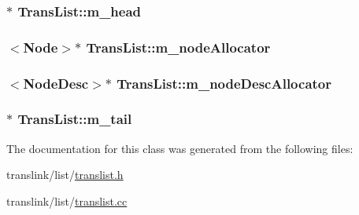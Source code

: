 \hypertarget{classTransList_ab8ac04fb16a967124ea772639fa0beb4}{
\subsubsection[{m\-\_\-head}]{$\ast$ Trans\-List\-::m\-\_\-head\hspace{0.3cm}{\ttfamily [private]}}}\label{classTransList_ab8ac04fb16a967124ea772639fa0beb4}
\hypertarget{classTransList_acab6fed9ee1f8d04411a384854cc9429}{
\subsubsection[{m\-\_\-node\-Allocator}]{$<${\bf Node}$>$$\ast$ Trans\-List\-::m\-\_\-node\-Allocator\hspace{0.3cm}{\ttfamily [private]}}}\label{classTransList_acab6fed9ee1f8d04411a384854cc9429}
\hypertarget{classTransList_ad8a7d0a3827838d2bc7c334502e00b1b}{
\subsubsection[{m\-\_\-node\-Desc\-Allocator}]{$<${\bf Node\-Desc}$>$$\ast$ Trans\-List\-::m\-\_\-node\-Desc\-Allocator\hspace{0.3cm}{\ttfamily [private]}}}\label{classTransList_ad8a7d0a3827838d2bc7c334502e00b1b}
\hypertarget{classTransList_a68984196e5b9927e15999d83dd74c8d7}{
\subsubsection[{m\-\_\-tail}]{$\ast$ Trans\-List\-::m\-\_\-tail\hspace{0.3cm}{\ttfamily [private]}}}\label{classTransList_a68984196e5b9927e15999d83dd74c8d7}


The documentation for this class was generated from the following files\-:\begin{DoxyCompactItemize}
\item 
translink/list/\hyperlink{translist_8h}{translist.\-h}\item 
translink/list/\hyperlink{translist_8cc}{translist.\-cc}\end{DoxyCompactItemize}

